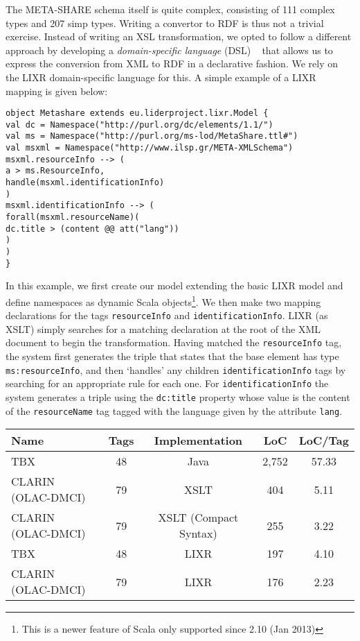 \documentclass{llncs}
\begin{document}
{The META-SHARE schema itself is quite complex, consisting of 111 complex types and 207 simp types. 
Writing a convertor to RDF is thus not a trivial exercise. Instead of writing an
XSL transformation, we opted to follow a different approach by developing a
\emph{domain-specific language} (DSL) ~\cite{fowler2010domain} that allows us to express the conversion from XML to RDF in a declarative fashion.
We rely on the LIXR domain-specific language for this. A simple example of a
LIXR mapping is given below:
{\footnotesize
\begin{verbatim}
object Metashare extends eu.liderproject.lixr.Model {
val dc = Namespace("http://purl.org/dc/elements/1.1/")
val ms = Namespace("http://purl.org/ms-lod/MetaShare.ttl#")
val msxml = Namespace("http://www.ilsp.gr/META-XMLSchema")
msxml.resourceInfo --> (
a > ms.ResourceInfo,
handle(msxml.identificationInfo)
)
msxml.identificationInfo --> (
forall(msxml.resourceName)(
dc.title > (content @@ att("lang"))
)
)
}
\end{verbatim}}
In this example, we first create our model extending the basic LIXR model and
define namespaces as dynamic Scala objects\footnote{This is a newer feature of
Scala only supported since 2.10 (Jan 2013)}. We then make two mapping
declarations for the tags {\tt resourceInfo} and {\tt identificationInfo}. LIXR (as
XSLT) simply searches for a matching declaration at the root of the XML document
to begin the transformation. Having matched the {\tt resourceInfo} tag, the system
first generates the triple that states that the base element has type
{\tt ms:resourceInfo}, and then `handles' any children {\tt identificationInfo} tags by
searching for an appropriate rule for each one. For {\tt identificationInfo} the
system generates a triple using the {\tt dc:title} property whose value is the
content of the {\tt resourceName} tag tagged with the language given by the
attribute {\tt lang}.
\begin{table}
\begin{center}
\begin{tabular}{p{4cm}|cccc}
Name & Tags & Implementation & LoC & LoC/Tag \\
\hline
TBX & 48 & Java & 2,752 & 57.33 \\
CLARIN (OLAC-DMCI) & 79 & XSLT & 404 & 5.11 \\
CLARIN (OLAC-DMCI) & 79 & XSLT (Compact Syntax) & 255 & 3.22 \\
\hline
TBX & 48 & LIXR & 197 & 4.10 \\
CLARIN (OLAC-DMCI) & 79 & LIXR & 176 & 2.23 \\

\end{tabular}
\end{center}
\end{table}}
\end{document}

